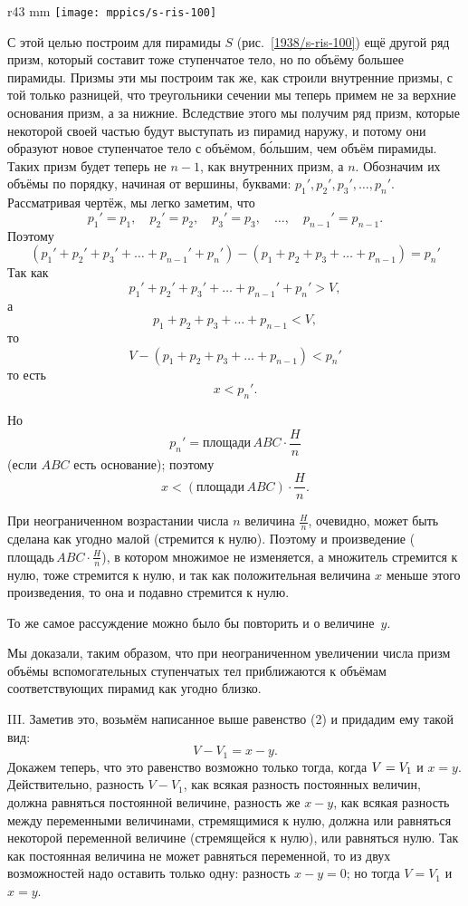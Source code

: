 \begin{wrapfigure}{r}{43 mm}
\vskip-0mm
\centering
\texttt{[image: mppics/s-ris-100]}
\caption{}\label{1938/s-ris-100}
\vskip-0mm
\end{wrapfigure}

С этой целью построим для пирамиды $S$ (рис.~\ref{1938/s-ris-100}) ещё другой ряд призм, который составит тоже ступенчатое тело, но по объёму большее пирамиды.
Призмы эти мы построим так же, как строили внутренние призмы, с той только разницей, что треугольники сечении мы теперь примем не за верхние основания призм, а за нижние.
Вследствие этого мы получим ряд призм, которые некоторой своей частью будут выступать из пирамид наружу, и потому они образуют новое ступенчатое тело с объёмом, б\'{о}льшим, чем объём пирамиды.
Таких призм будет теперь не $n-1$, как внутренних призм, а $n$.
Обозначим их объёмы по порядку, начиная от вершины, буквами: $p_1',p_2',p_3',\dots,p_n'$.
Рассматривая чертёж, мы легко заметим, что
\[p_1'=p_1,\quad p_2'=p_2,\quad p_3'=p_3,\quad\dots, \quad p_{n-1}'=p_{n-1}.\]
Поэтому
\[(p_1'+p_2'+p_3'+\dots+p_{n-1}'+p_n')-(p_1+p_2+p_3+\dots+p_{n-1})=p_n'\]
Так как
\[p_1'+p_2'+p_3'+\dots+p_{n-1}'+p_n'>V,\]
а
\[p_1+p_2+p_3+\dots+p_{n-1}<V,\]
то
\[V-(p_1+p_2+p_3+\dots+p_{n-1})<p_n'\]
то есть
\[x<p_n'.\]

Но 
\[p_n'=\text{площади}\, ABC\cdot \frac Hn\]
(если $ABC$ есть основание); поэтому
\[x<(\text{площади}\, ABC)\cdot \frac Hn.\]

При неограниченном возрастании числа $n$ величина $\frac Hn$, очевидно, может быть сделана как угодно малой (стремится к нулю).
Поэтому и произведение ($\text{площадь}\, ABC\cdot \frac Hn$), в котором множимое не изменяется, а множитель стремится к нулю, тоже стремится к нулю, и так как положительная величина $x$ меньше этого произведения, то она и подавно стремится к нулю.

То же самое рассуждение можно было бы повторить и о величине~$y$.

Мы доказали, таким образом, что при неограниченном увеличении числа призм объёмы вспомогательных ступенчатых тел приближаются к объёмам соответствующих пирамид как угодно близко.

III.
Заметив это, возьмём написанное выше равенство (2) и придадим ему такой вид: 
\[V - V_1 = x - y.\]
Докажем теперь, что это равенство возможно только тогда, когда $V\z=V_1$ и $x=y$.
Действительно, разность $V-V_1$, как всякая разность постоянных величин, должна равняться постоянной величине, разность же $x-y$, как всякая разность между переменными величинами, стремящимися к нулю, должна или равняться некоторой переменной величине (стремящейся к нулю), или равняться нулю.
Так как постоянная величина не может равняться переменной, то из двух возможностей надо оставить только одну: разность $x-y=0$;
но тогда $V=V_1$ и $x=y$.

